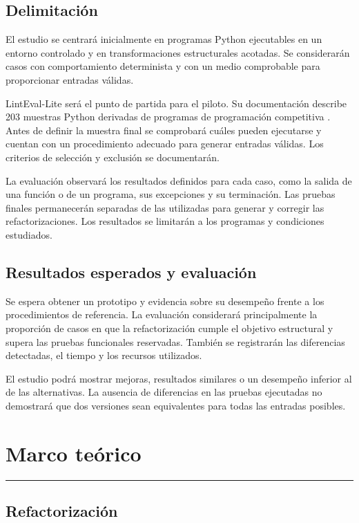 \documentclass[11pt,openright,final]{unsa}
\begin{document}
\section{Delimitación}

El estudio se centrará inicialmente en programas Python ejecutables en un entorno controlado y en transformaciones estructurales acotadas. Se considerarán casos con comportamiento determinista y con un medio comprobable para proporcionar entradas válidas.

LintEval-Lite será el punto de partida para el piloto. Su documentación describe 203 muestras Python derivadas de programas de programación competitiva \cite{ref7}. Antes de definir la muestra final se comprobará cuáles pueden ejecutarse y cuentan con un procedimiento adecuado para generar entradas válidas. Los criterios de selección y exclusión se documentarán.

La evaluación observará los resultados definidos para cada caso, como la salida de una función o de un programa, sus excepciones y su terminación. Las pruebas finales permanecerán separadas de las utilizadas para generar y corregir las refactorizaciones. Los resultados se limitarán a los programas y condiciones estudiados.

\section{Resultados esperados y evaluación}

Se espera obtener un prototipo y evidencia sobre su desempeño frente a los procedimientos de referencia. La evaluación considerará principalmente la proporción de casos en que la refactorización cumple el objetivo estructural y supera las pruebas funcionales reservadas. También se registrarán las diferencias detectadas, el tiempo y los recursos utilizados.

El estudio podrá mostrar mejoras, resultados similares o un desempeño inferior al de las alternativas. La ausencia de diferencias en las pruebas ejecutadas no demostrará que dos versiones sean equivalentes para todas las entradas posibles.


\chapter{Marco teórico}
\hrule\bigskip\vspace*{1cm}

\section{Refactorización}
\end{document}
